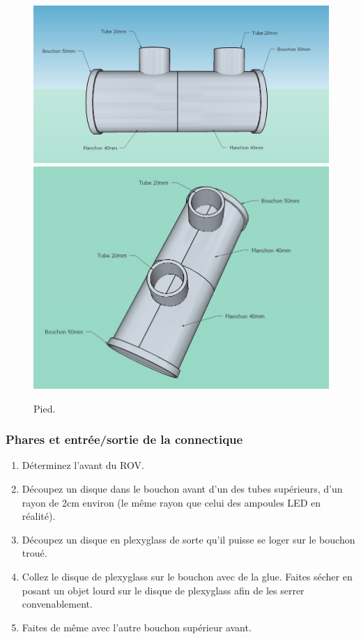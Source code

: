 \documentclass[11pt,a4paper]{article}
\begin{document}
        \begin{figure}[H]
            \centering
            \includegraphics[scale=0.245]{ROVPiedCote.jpg}
            \includegraphics[scale=0.2]{ROVPiedHaut.jpg}
            \caption{Pied.}
          \end{figure}
        
        \subsubsection{Phares et entrée/sortie de la connectique}
          \begin{enumerate}
            \item Déterminez l'avant du ROV.
            \item Découpez un disque dans le bouchon avant d'un des tubes supérieurs, d'un rayon de 2cm environ (le même rayon que celui des ampoules LED en réalité).
            \item Découpez un disque en plexyglass de sorte qu'il puisse se loger sur le bouchon troué.
            \item Collez le disque de plexyglass sur le bouchon avec de la glue. Faites sécher en posant un objet lourd sur le disque de plexyglass afin de les serrer convenablement.
            \item Faites de même avec l'autre bouchon supérieur avant.
          \end{enumerate}
          
\end{document}
